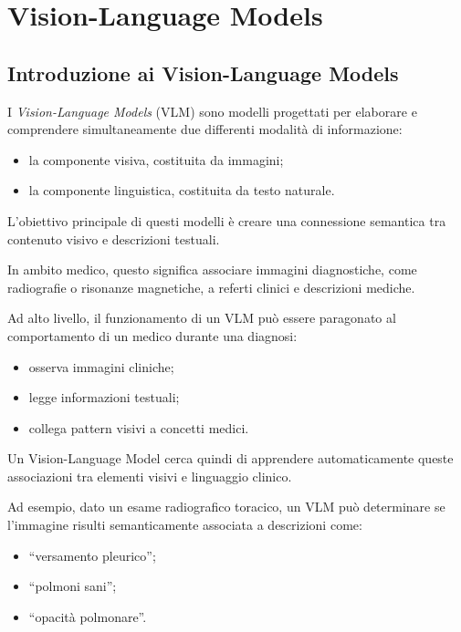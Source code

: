 %
%
\chapter{Vision-Language Models}

\section{Introduzione ai Vision-Language Models}

I \textit{Vision-Language Models} (VLM) sono modelli progettati per elaborare e comprendere simultaneamente due differenti modalità di informazione:

\begin{itemize}
    \item la componente visiva, costituita da immagini;
    \item la componente linguistica, costituita da testo naturale.
\end{itemize}

L'obiettivo principale di questi modelli è creare una connessione semantica tra contenuto visivo e descrizioni testuali.

In ambito medico, questo significa associare immagini diagnostiche, come radiografie o risonanze magnetiche, a referti clinici e descrizioni mediche.

Ad alto livello, il funzionamento di un VLM può essere paragonato al comportamento di un medico durante una diagnosi:

\begin{itemize}
    \item osserva immagini cliniche;
    \item legge informazioni testuali;
    \item collega pattern visivi a concetti medici.
\end{itemize}

Un Vision-Language Model cerca quindi di apprendere automaticamente queste associazioni tra elementi visivi e linguaggio clinico.

Ad esempio, dato un esame radiografico toracico, un VLM può determinare se l'immagine risulti semanticamente associata a descrizioni come:

\begin{itemize}
    \item ``versamento pleurico'';
    \item ``polmoni sani'';
    \item ``opacità polmonare''.
\end{itemize}

